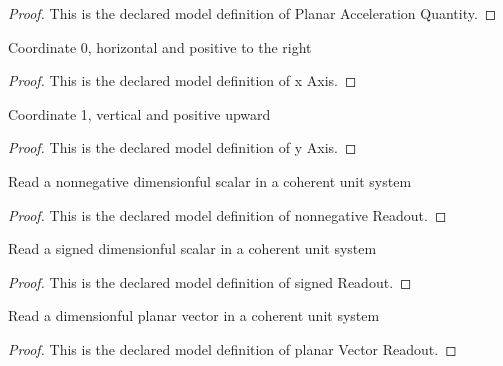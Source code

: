 \begin{proof}
  This is the declared model definition of Planar Acceleration Quantity.
\end{proof}
\begin{definition}[x Axis]
  \label{def:physics:phyx-mini-0768:phyxminiproblems-problemphyxmini0768-xaxis}
  Coordinate 0, horizontal and positive to the right
\end{definition}
\begin{proof}
  This is the declared model definition of x Axis.
\end{proof}
\begin{definition}[y Axis]
  \label{def:physics:phyx-mini-0768:phyxminiproblems-problemphyxmini0768-yaxis}
  Coordinate 1, vertical and positive upward
\end{definition}
\begin{proof}
  This is the declared model definition of y Axis.
\end{proof}
\begin{definition}
  \label{def:physics:phyx-mini-0768:phyxminiproblems-problemphyxmini0768-nonnegativereadout}
  Read a nonnegative dimensionful scalar in a coherent unit system
\end{definition}
\begin{proof}
  This is the declared model definition of nonnegative Readout.
\end{proof}
\begin{definition}
  \label{def:physics:phyx-mini-0768:phyxminiproblems-problemphyxmini0768-signedreadout}
  Read a signed dimensionful scalar in a coherent unit system
\end{definition}
\begin{proof}
  This is the declared model definition of signed Readout.
\end{proof}
\begin{definition}
  \label{def:physics:phyx-mini-0768:phyxminiproblems-problemphyxmini0768-planarvectorreadout}
  Read a dimensionful planar vector in a coherent unit system
\end{definition}
\begin{proof}
  This is the declared model definition of planar Vector Readout.
\end{proof}
